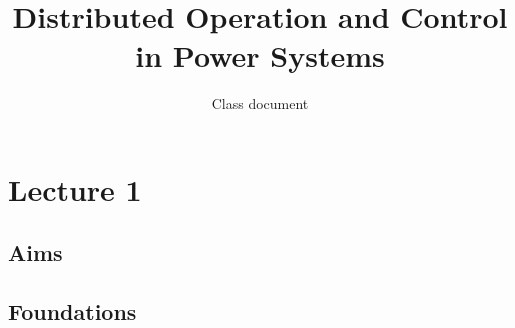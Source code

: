 \documentclass{article}
\title{Distributed Operation and Control in Power Systems}
\author{
  Class document\\
}
\begin{document}
\maketitle

\begin{abstract}

\end{abstract}

\section{Lecture 1}
\subsection{Aims}

\subsection{Foundations}
\end{document}

